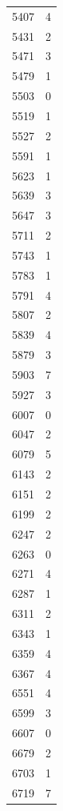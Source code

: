 \documentclass[10pt,a4paper]{amsart}
\begin{document}
\begin{table}[htbp]
\begin{minipage}{0.135\textwidth}
\begin{tabular}{c|c}
        5407 & 4 \\
        5431 & 2 \\
        5471 & 3 \\
        5479 & 1 \\
        5503 & 0 \\
        5519 & 1 \\
        5527 & 2 \\
        5591 & 1 \\
        5623 & 1 \\
        5639 & 3 \\
        5647 & 3 \\
        5711 & 2 \\
        5743 & 1 \\
        5783 & 1 \\
        5791 & 4 \\
        5807 & 2 \\
        5839 & 4 \\
        5879 & 3 \\
        5903 & 7 \\
        5927 & 3 \\
        6007 & 0 \\
        6047 & 2 \\
        6079 & 5 \\
        6143 & 2 \\
        6151 & 2 \\
        6199 & 2 \\
        6247 & 2 \\
        6263 & 0 \\
        6271 & 4 \\
        6287 & 1 \\
        6311 & 2 \\
        6343 & 1 \\
        6359 & 4 \\
        6367 & 4 \\
        6551 & 4 \\
        6599 & 3 \\
        6607 & 0 \\
        6679 & 2 \\
        6703 & 1 \\
        6719 & 7
    \end{tabular}
\end{minipage}\hspace{-2mm}
%
\begin{minipage}{0.135\textwidth}
    \centering

\end{minipage}
\end{table}
\end{document}
